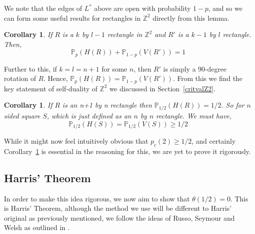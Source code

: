 \documentclass[a4paper,11pt]{article}
\newtheorem{corollary}[theorem]{Corollary}
\theoremstyle{definition}
\newcommand{\ints}{\mathbb{Z}}
\newcommand{\prob}{\mathbb{P}_p}
\begin{document}
We note that the edges of $L^*$ above are open with probability $1-p$, and so we can form some useful results for rectangles in $\ints^2$ directly from this lemma.

\begin{corollary}
	If $R$ is a $k$ by $l-1$ rectangle in $\ints^2$ and $R'$ is a $k-1$ by $l$ rectangle. Then,
	$$\prob(H(R))+\mathbb{P}_{1-p}(V(R')) = 1 $$
\end{corollary}

Further to this, if $k = l = n+1$ for some $n$, then $R'$ is simply a 90-degree rotation of $R$. Hence, $\prob(H(R)) = \mathbb{P}_{1-p}(V(R'))$. From this we find the key statement of self-duality of $\ints^2$ we discussed in Section~\ref*{critvalZ2}.

\begin{corollary}\label{squareGEQhalf}
	If $R$ is an n+1 by n rectangle then $\mathbb{P}_{1/2}(H(R)) = 1/2$. So for $n$ sided square $S$, which is just defined as an $n$ by $n$ rectangle. We must have,
	$$\mathbb{P}_{1/2}(H(S))=\mathbb{P}_{1/2}(V(S)) \geq 1/2$$
\end{corollary}

While it might now feel intuitively obvious that $p_c(2) \geq 1/2$, and certainly Corollary~\ref*{squareGEQhalf} is essential in the reasoning for this, we are yet to prove it rigorously.

\subsection{Harris' Theorem}

In order to make this idea rigorous, we now aim to show that $\theta(1/2) = 0$. This is Harris' Theorem, although the method we use will be different to Harris' original as previously mentioned, we follow the ideas of Russo, Seymour and Welsh as outlined in \cite{bollobas2006short}.
\end{document}
